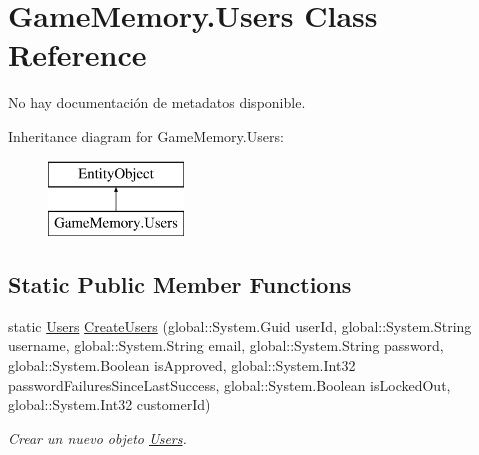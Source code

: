 \hypertarget{class_game_memory_1_1_users}{\section{Game\-Memory.\-Users Class Reference}
\label{class_game_memory_1_1_users}
}


No hay documentación de metadatos disponible.  


Inheritance diagram for Game\-Memory.\-Users\-:\begin{figure}[H]
\begin{center}
\leavevmode
\includegraphics[height=2.000000cm]{class_game_memory_1_1_users}
\end{center}
\end{figure}
\subsection*{Static Public Member Functions}
\begin{DoxyCompactItemize}
\item 
static \hyperlink{class_game_memory_1_1_users}{Users} \hyperlink{class_game_memory_1_1_users_a299cec11198e4aaa738c60c535dd3af4}{Create\-Users} (global\-::\-System.\-Guid user\-Id, global\-::\-System.\-String username, global\-::\-System.\-String email, global\-::\-System.\-String password, global\-::\-System.\-Boolean is\-Approved, global\-::\-System.\-Int32 password\-Failures\-Since\-Last\-Success, global\-::\-System.\-Boolean is\-Locked\-Out, global\-::\-System.\-Int32 customer\-Id)
\begin{DoxyCompactList}\small\item\em Crear un nuevo objeto \hyperlink{class_game_memory_1_1_users}{Users}. \end{DoxyCompactList}\end{DoxyCompactItemize}

